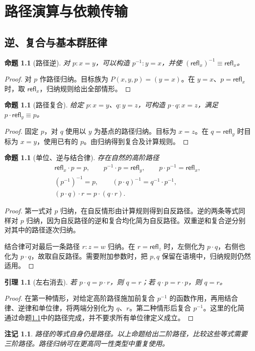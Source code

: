 \documentclass[12pt,oneside,openany,fontset=none]{ctexbook}
\theoremstyle{cn}
\newtheorem{lemma}[definition]{引理}
\newtheorem{proposition}[definition]{命题}
\newtheorem{remark}[definition]{注记}
\numberwithin{equation}{chapter}
\newcommand{\refl}{\mathsf{refl}}
\begin{document}
\chapter{路径演算与依赖传输}
\section{逆、复合与基本群胚律}
\begin{proposition}[路径逆]
对 $p:x=y$，可以构造 $p^{-1}:y=x$，并使 $(\refl_x)^{-1}\equiv\refl_x$。
\end{proposition}
\begin{proof}
对 $p$ 作路径归纳。目标族为 $P(x,y,p)=(y=x)$。在 $y=x$、$p=\refl_x$ 时，取 $\refl_x$，归纳规则给出全部情形。
\end{proof}
\begin{proposition}[路径复合]
给定 $p:x=y$、$q:y=z$，可构造 $p\cdot q:x=z$，满足 $p\cdot\refl_y\equiv p$。
\end{proposition}
\begin{proof}
固定 $p$，对 $q$ 使用以 $y$ 为基点的路径归纳。目标为 $x=z$。在 $q=\refl_y$ 时目标为 $x=y$，使用已有的 $p$。由归纳得到复合及计算规则。
\end{proof}
\begin{proposition}[单位、逆与结合律]\label{prop:pathlaws}
存在自然的高阶路径
\begin{gather*}
\refl_x\cdot p=p,
\qquad p^{-1}\cdot p=\refl_y,
\qquad p\cdot p^{-1}=\refl_x,\\
(p^{-1})^{-1}=p,
\qquad(p\cdot q)^{-1}=q^{-1}\cdot p^{-1},\\
(p\cdot q)\cdot r=p\cdot(q\cdot r).
\end{gather*}
\end{proposition}
\begin{proof}
第一式对 $p$ 归纳，在自反情形由计算规则得到自反路径。逆的两条等式同样对 $p$ 归纳，因为自反路径的逆和复合均化简为自反路径。双重逆和复合逆分别对其中的路径逐次归纳。

结合律可对最后一条路径 $r:z=w$ 归纳。在 $r=\refl_z$ 时，左侧化为 $p\cdot q$，右侧也化为 $p\cdot q$，故取自反路径。需要附加参数时，把 $p,q$ 保留在语境中，归纳规则仍然适用。
\end{proof}
\begin{lemma}[左右消去]
若 $p\cdot q=p\cdot r$，则 $q=r$；若 $q\cdot p=r\cdot p$，则 $q=r$。
\end{lemma}
\begin{proof}
在第一种情形，对给定高阶路径施加前复合 $p^{-1}$ 的函数作用，再用结合律、逆律和单位律，将两端分别化为 $q$、$r$。第二种情形后复合 $p^{-1}$。这里的化简通过命题\ref{prop:pathlaws}中的路径完成，并不要求所有单位律定义成立。
\end{proof}
\begin{remark}
路径的等式自身仍是路径。以上命题给出二阶路径，比较这些等式需要三阶路径。路径归纳可在更高同一性类型中重复使用。
\end{remark}
\end{document}
